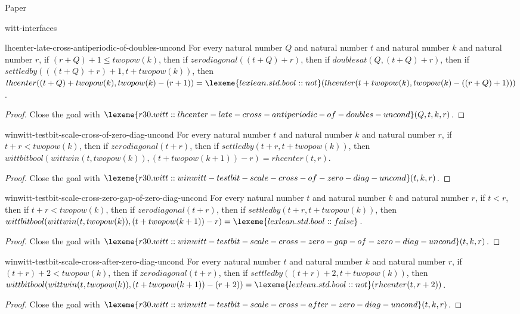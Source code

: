 \begin{lexlean}{Paper}
\begin{section}{witt-interfaces}
  \begin{theorem}{lhcenter-late-cross-antiperiodic-of-doubles-uncond}
  For every natural number \(Q\) and natural number \(t\) and natural number \(k\) and natural number \(r\), if \((r + Q) + 1 ≤ twopow(k)\), then if \(zerodiagonal((t + Q) + r)\), then if \(doublesat(Q, (t + Q) + r)\), then if \(settledby(((t + Q) + r) + 1, t + twopow(k))\), then \(lhcenter((t + Q) + twopow(k), twopow(k) - (r + 1)) = \lexeme{lexlean.std.bool::not}(lhcenter(t + twopow(k), twopow(k) - ((r + Q) + 1)))\).
  \begin{proof}
  Close the goal with \(\lexeme{r30.witt::lhcenter-late-cross-antiperiodic-of-doubles-uncond}(Q, t, k, r)\).
  \end{proof}
  \end{theorem}

  \begin{theorem}{winwitt-testbit-scale-cross-of-zero-diag-uncond}
  For every natural number \(t\) and natural number \(k\) and natural number \(r\), if \(t + r < twopow(k)\), then if \(zerodiagonal(t + r)\), then if \(settledby(t + r, t + twopow(k))\), then \(wittbitbool(wittwin(t, twopow(k)), (t + twopow(k + 1)) - r) = rhcenter(t, r)\).
  \begin{proof}
  Close the goal with \(\lexeme{r30.witt::winwitt-testbit-scale-cross-of-zero-diag-uncond}(t, k, r)\).
  \end{proof}
  \end{theorem}

  \begin{theorem}{winwitt-testbit-scale-cross-zero-gap-of-zero-diag-uncond}
  For every natural number \(t\) and natural number \(k\) and natural number \(r\), if \(t < r\), then if \(t + r < twopow(k)\), then if \(zerodiagonal(t + r)\), then if \(settledby(t + r, t + twopow(k))\), then \(wittbitbool(wittwin(t, twopow(k)), (t + twopow(k + 1)) - r) = \lexeme{lexlean.std.bool::false}\).
  \begin{proof}
  Close the goal with \(\lexeme{r30.witt::winwitt-testbit-scale-cross-zero-gap-of-zero-diag-uncond}(t, k, r)\).
  \end{proof}
  \end{theorem}

  \begin{theorem}{winwitt-testbit-scale-cross-after-zero-diag-uncond}
  For every natural number \(t\) and natural number \(k\) and natural number \(r\), if \((t + r) + 2 < twopow(k)\), then if \(zerodiagonal(t + r)\), then if \(settledby((t + r) + 2, t + twopow(k))\), then \(wittbitbool(wittwin(t, twopow(k)), (t + twopow(k + 1)) - (r + 2)) = \lexeme{lexlean.std.bool::not}(rhcenter(t, r + 2))\).
  \begin{proof}
  Close the goal with \(\lexeme{r30.witt::winwitt-testbit-scale-cross-after-zero-diag-uncond}(t, k, r)\).
  \end{proof}
  \end{theorem}


\end{section}
\end{lexlean}
